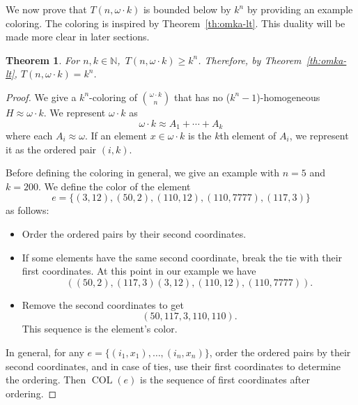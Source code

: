 \documentclass[11pt]{article}
\newcommand{\om}{\omega}
\newcommand{\oequiv}{\approx}
\newcommand{\setconcat}{+}
\newcommand{\COL}{\operatorname{COL}}
\newcommand{\N}{\mathbb{N}}
\newcommand{\numpoints}{n}
\newcommand{\Commonconst}{A}
\theoremstyle{plain}
\newtheorem{theorem}{Theorem}[section]
\theoremstyle{definition}
\begin{document}
We now prove that $T(\numpoints, \omega \cdot k)$ is bounded below by $k^{\numpoints}$ by providing an example coloring. The coloring is inspired by Theorem~\ref{th:omka-lt}. This duality will be made more clear in later sections.

\begin{theorem}\label{th:omka-gt}
For $\numpoints,k \in \N$,~$T(\numpoints,\om \cdot k) \geq k^{\numpoints}$. Therefore, by Theorem~\ref{th:omka-lt}, $T(\numpoints,\om \cdot k) = k^{\numpoints}$.
\end{theorem}
\begin{proof}
We give a $k^{\numpoints}$-coloring of $\binom{\om \cdot k}{\numpoints}$ that has no ($k^{\numpoints}-1$)-homogeneous $H\oequiv \om\cdot k$.
We represent $\om \cdot k$ as
$$\om \cdot k \oequiv \Commonconst_1 \setconcat \cdots \setconcat \Commonconst_k$$
where each $\Commonconst_i \oequiv \om$.
If an element $x \in \om \cdot k$ is the $k$th element of $\Commonconst_i$, we represent it as the ordered pair $(i,k)$.

Before defining the coloring in general, we give an example with $\numpoints=5$ and $k=200$. 
%
We define the color of the element
$$e=\{ (3,12), (50,2), (110,12), (110,7777), (117,3) \}$$
as follows:


\begin{itemize}
\item
Order the ordered pairs by their second coordinates.
\item
If some elements have the same second coordinate, break the tie with their first coordinates. At this point in our example we have
$$((50,2), (117,3) (3,12), (110,12), (110,7777)).$$
\item
Remove the second coordinates to get
$$(50,117,3,110,110).$$
This sequence is the element's color.
\end{itemize}


In general, for any $e=\{(i_1,x_1),\ldots,(i_{\numpoints},x_{\numpoints})\}$, order the ordered pairs by their second coordinates, and in case of ties, use their first coordinates to determine the ordering. Then
$\COL(e)$ is the sequence of first coordinates after ordering.


\end{proof}
\end{document}

